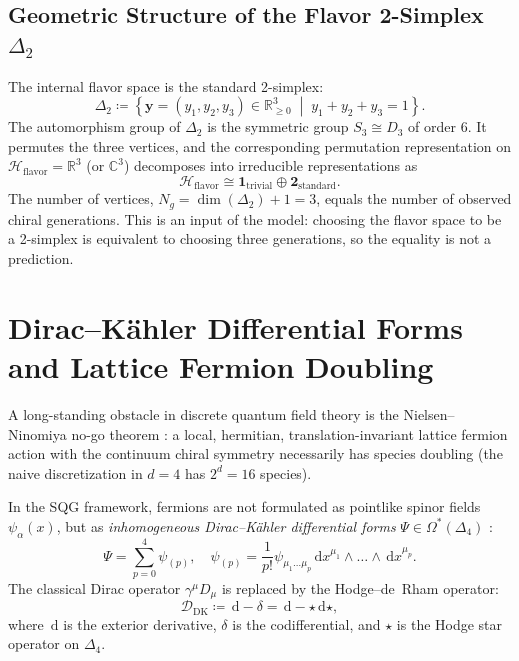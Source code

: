 \documentclass[11pt,a4paper,reqno]{amsart}
\theoremstyle{definition}
\numberwithin{equation}{section}
\newcommand{\R}{\mathbb{R}}
\newcommand{\C}{\mathbb{C}}
\newcommand{\dif}{\,\mathrm{d}}
\begin{document}
\subsection{Geometric Structure of the Flavor 2-Simplex \texorpdfstring{$\Delta_2$}{Delta2}}
The internal flavor space is the standard 2-simplex:
\begin{equation}
    \label{eq:delta2_def}
    \Delta_2 \coloneqq \left\{ \mathbf{y} = (y_1, y_2, y_3) \in \R_{\ge 0}^3 \;\middle|\; y_1 + y_2 + y_3 = 1 \right\}.
\end{equation}
The automorphism group of $\Delta_2$ is the symmetric group $S_3 \cong D_3$ of order 6. It permutes the three vertices, and the corresponding permutation representation on $\mathcal{H}_{\mathrm{flavor}} = \R^3$ (or $\C^3$) decomposes into irreducible representations as
\begin{equation}
    \label{eq:s3_decomposition}
    \mathcal{H}_{\mathrm{flavor}} \cong \mathbf{1}_{\mathrm{trivial}} \oplus \mathbf{2}_{\mathrm{standard}}.
\end{equation}
The number of vertices, $N_g = \dim(\Delta_2) + 1 = 3$, equals the number of observed chiral generations. This is an input of the model: choosing the flavor space to be a 2-simplex is equivalent to choosing three generations, so the equality is not a prediction.

\section{Dirac--K\"ahler Differential Forms and Lattice Fermion Doubling}
\label{sec:dirac_kahler}

A long-standing obstacle in discrete quantum field theory is the Nielsen--Ninomiya no-go theorem \cite{nielsen1981absence}: a local, hermitian, translation-invariant lattice fermion action with the continuum chiral symmetry necessarily has species doubling (the naive discretization in $d = 4$ has $2^d = 16$ species).

In the SQG framework, fermions are not formulated as pointlike spinor fields $\psi_\alpha(x)$, but as \emph{inhomogeneous Dirac--K\"ahler differential forms} $\Psi \in \Omega^*(\Delta_4)$ \cite{kahler1962innere, becher1982dirac, rabin1982homology}:
\begin{equation}
    \label{eq:dirac_kahler_field}
    \Psi = \sum_{p=0}^4 \psi_{(p)}, \quad \psi_{(p)} = \frac{1}{p!} \psi_{\mu_1 \dots \mu_p} \dif x^{\mu_1} \wedge \dots \wedge \dif x^{\mu_p}.
\end{equation}
The classical Dirac operator $\gamma^\mu D_\mu$ is replaced by the Hodge--de~Rham operator:
\begin{equation}
    \label{eq:hodge_de_rham}
    \mathcal{D}_{\mathrm{DK}} \coloneqq \dif - \delta = \dif - \star \dif \star,
\end{equation}
where $\dif$ is the exterior derivative, $\delta$ is the codifferential, and $\star$ is the Hodge star operator on $\Delta_4$.
\end{document}

